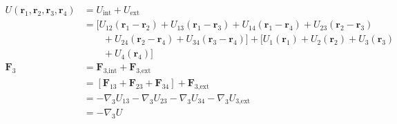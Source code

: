 \documentclass{article}
\renewcommand{\vec}[1]{\boldsymbol{\mathbf{#1}}}
\begin{document}
\begin{align*}
  U(\vec{r}_1, \vec{r}_2, \vec{r}_3, \vec{r}_4) & = U_\text{int} + U_\text{ext}                                                                                                    \\
                                                & = [U_{12}(\vec{r}_1 - \vec{r}_2) + U_{13}(\vec{r}_1 - \vec{r}_3) + U_{14}(\vec{r}_1 - \vec{r}_4) + U_{23}(\vec{r}_2 - \vec{r}_3) \\
                                                & \qquad + U_{24}(\vec{r}_2 - \vec{r}_4) + U_{34}(\vec{r}_3 - \vec{r}_4)] + [U_1(\vec{r}_1) + U_2(\vec{r}_2) + U_3(\vec{r}_3)      \\
                                                & \qquad + U_4(\vec{r}_4)]                                                                                                         \\
  \vec{F}_3                                     & = \vec{F}_{3 \text{,int}} + \vec{F}_{3 \text{,ext}}                                                                              \\
                                                & = [\vec{F}_{13} + \vec{F}_{23} + \vec{F}_{34}] + \vec{F}_{3 \text{,ext}}                                                         \\
                                                & = -\nabla_3 U_{13} - \nabla_3 U_{23} - \nabla_3 U_{34} - \nabla_3 U_{3 \text{,ext}}                                              \\
                                                & = -\nabla_3 U
\end{align*}

\setcounter{subsection}{52}
\subsection{}
\end{document}
